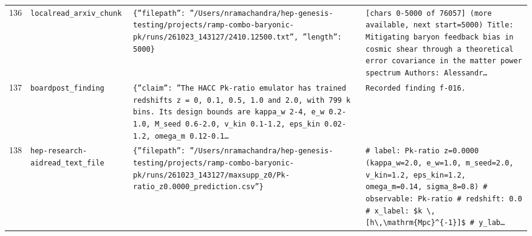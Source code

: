 \documentclass[11pt,a4paper]{article}
\begin{document}
\begin{longtable}{@{}p{}p{}p{}p{}@{}}
136 & \texttt{local}\newline\texttt{read\_\allowbreak{}arxiv\_\allowbreak{}chunk} & \texttt{\{''filepath'':\allowbreak{} ''/\allowbreak{}Users/\allowbreak{}nramachandra/\allowbreak{}hep-genesis-testing/\allowbreak{}projects/\allowbreak{}ramp-combo-baryonic-pk/\allowbreak{}runs/\allowbreak{}261023\_\allowbreak{}143127/\allowbreak{}2410.12500.txt'',\allowbreak{} ''length'':\allowbreak{} 5000\}\allowbreak{}} & \texttt{[chars 0-5000 of 76057]\allowbreak{} (more available,\allowbreak{} next start=\allowbreak{}5000)\allowbreak{}  Title:\allowbreak{} Mitigating baryon feedback bias in cosmic shear through a theoretical error covariance in the matter power spectrum Authors:\allowbreak{} Alessandr\ldots{}\allowbreak{}} \\
137 & \texttt{board}\newline\texttt{post\_\allowbreak{}finding} & \texttt{\{''claim'':\allowbreak{} ''The HACC Pk-ratio emulator has trained redshifts z =\allowbreak{} 0,\allowbreak{} 0.1,\allowbreak{} 0.5,\allowbreak{} 1.0 and 2.0,\allowbreak{} with 799 k bins. Its design bounds are kappa\_\allowbreak{}w 2-4,\allowbreak{} e\_\allowbreak{}w 0.2-1.0,\allowbreak{} M\_\allowbreak{}seed 0.6-2.0,\allowbreak{} v\_\allowbreak{}kin 0.1-1.2,\allowbreak{} eps\_\allowbreak{}kin 0.02-1.2,\allowbreak{} omega\_\allowbreak{}m 0.12-0.1\ldots{}\allowbreak{}} & \texttt{Recorded finding f-016.} \\
138 & \texttt{hep-research-aid}\newline\texttt{read\_\allowbreak{}text\_\allowbreak{}file} & \texttt{\{''filepath'':\allowbreak{} ''/\allowbreak{}Users/\allowbreak{}nramachandra/\allowbreak{}hep-genesis-testing/\allowbreak{}projects/\allowbreak{}ramp-combo-baryonic-pk/\allowbreak{}runs/\allowbreak{}261023\_\allowbreak{}143127/\allowbreak{}maxsupp\_\allowbreak{}z0/\allowbreak{}Pk-ratio\_\allowbreak{}z0.0000\_\allowbreak{}prediction.csv''\}\allowbreak{}} & \texttt{\# label:\allowbreak{} Pk-ratio z=\allowbreak{}0.0000 (kappa\_\allowbreak{}w=\allowbreak{}2.0,\allowbreak{} e\_\allowbreak{}w=\allowbreak{}1.0,\allowbreak{} m\_\allowbreak{}seed=\allowbreak{}2.0,\allowbreak{} v\_\allowbreak{}kin=\allowbreak{}1.2,\allowbreak{} eps\_\allowbreak{}kin=\allowbreak{}1.2,\allowbreak{} omega\_\allowbreak{}m=\allowbreak{}0.14,\allowbreak{} sigma\_\allowbreak{}8=\allowbreak{}0.8)\allowbreak{} \# observable:\allowbreak{} Pk-ratio \# redshift:\allowbreak{} 0.0 \# x\_\allowbreak{}label:\allowbreak{} \$k \textbackslash{}\allowbreak{},\allowbreak{} [h\textbackslash{}\allowbreak{},\allowbreak{}\textbackslash{}\allowbreak{}mathrm\{Mpc\}\allowbreak{}\textasciicircum{}\allowbreak{}\{-1\}\allowbreak{}]\allowbreak{}\$ \# y\_\allowbreak{}lab\ldots{}\allowbreak{}} \\

\end{longtable}
\end{document}
